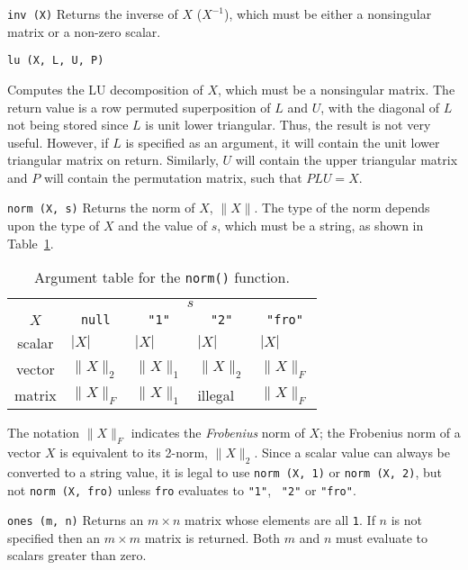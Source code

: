 \begin{dispitems}
\item[\tt inv (X)]
Returns the inverse of $X$ ($X^{-1}$), which must be either a
nonsingular matrix or a non-zero scalar.

\item[\tt lu (X, L, U, P)]

Computes the LU decomposition of $X$, which must be a nonsingular
matrix.  The return value is a row permuted superposition of $L$ and
$U$, with the diagonal of $L$ not being stored since $L$ is unit lower
triangular.  Thus, the result is not very useful.  However, if $L$ is
specified as an argument, it will contain the unit lower triangular
matrix on return.  Similarly, $U$ will contain the upper triangular
matrix and $P$ will contain the permutation matrix, such that $PLU=X$.

\item[\tt norm (X, s)]
Returns the norm of $X$, $\| X \|$.  The type of the norm depends upon
the type of $X$ and the value of $s$, which must be a string, as shown
in Table~\ref{burlap.norm.table}.

\begin{table}[htbp]
\centering
\begin{tabular}{c|l|l|l|l}
& \multicolumn{4}{c}{$s$} \\ \cline{2-5}
$X$ & \multicolumn{1}{c|}{\tt null} & \multicolumn{1}{c|}{\tt "1"}
& \multicolumn{1}{c|}{\tt "2"} & \multicolumn{1}{c}{\tt "fro"} \\
\hline
scalar & $| X |$     & $| X |$	   & $| X |$	 & $| X |$     \\
vector & $\| X \|_2$ & $\| X \|_1$ & $\| X \|_2$ & $\| X \|_F$ \\
matrix & $\| X \|_F$ & $\| X \|_1$ & illegal	 & $\| X \|_F$ \\
\end{tabular}
\caption{Argument table for the {\tt norm()} function.}
\label{burlap.norm.table}
\end{table}

The notation $\| X \|_F$ indicates the {\em Frobenius} norm of $X$;
the Frobenius norm of a vector $X$ is equivalent to its 2-norm, $\| X
\|_2$.  Since a scalar value can always be converted to a string
value, it is legal to use {\tt norm (X, 1)} or {\tt norm (X, 2)}, but
not {\tt norm (X, fro)} unless {\tt fro} evaluates to {\tt "1"}, {\tt
"2"} or {\tt "fro"}.

\item[\tt ones (m, n)]
Returns an $m \times n$ matrix whose elements are all {\tt 1}.  If $n$
is not specified then an $m \times m$ matrix is returned.  Both $m$
and $n$ must evaluate to scalars greater than zero.


\end{dispitems}
